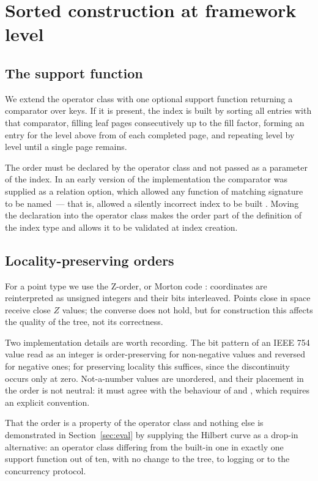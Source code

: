 \section{Sorted construction at framework level}
\label{sec:build}

\subsection{The support function}

We extend the operator class with one optional support function returning a
comparator over keys. If it is present, the index is built by sorting all
entries with that comparator, filling leaf pages consecutively up to the fill
factor, forming an entry for the level above from  of each completed
page, and repeating level by level until a single page remains.

The order must be declared by the operator class and not passed as a parameter
of the index. In an early version of the implementation the comparator was
supplied as a relation option, which allowed any function of matching signature to be named~--- that
is, allowed a silently incorrect index to be built \cite{thread-fast-build}.
Moving the declaration into the operator class makes the order part of the
definition of the index type and allows it to be validated at index creation.

\subsection{Locality-preserving orders}

For a point type we use the Z-order, or Morton code \cite{morton1966,
orenstein1984zorder}: coordinates are reinterpreted as unsigned integers and
their bits interleaved. Points close in space receive close $Z$ values; the
converse does not hold, but for construction this affects the quality of the
tree, not its correctness.

Two implementation details are worth recording. The bit pattern of an IEEE 754
value read as an integer is order-preserving for non-negative values and
reversed for negative ones; for preserving locality this suffices, since the
discontinuity occurs only at zero. Not-a-number values are unordered, and their
placement in the order is not neutral: it must agree with the behaviour of
 and , which requires an explicit convention.

That the order is a property of the operator class and nothing else is
demonstrated in Section~\ref{sec:eval} by supplying the Hilbert curve as a
drop-in alternative: an operator class differing from the built-in one in
exactly one support function out of ten, with no change to the tree, to logging
or to the concurrency protocol.


